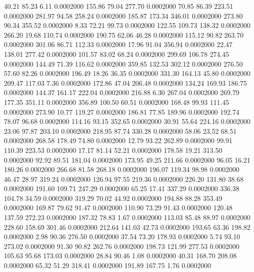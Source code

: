   40.21   85.23    6.11   0.0002000
 155.86   79.04  277.70   0.0002000
  70.85   86.39  223.51   0.0002000
 281.97   94.58  258.24   0.0002000
 185.87  173.34  346.01   0.0002000
 273.80   90.34  355.52   0.0002000
   8.33   72.21   99.73   0.0002000
 122.55  109.73  138.32   0.0002000
 266.20   19.68  110.74   0.0002000
 190.75   62.06   46.28   0.0002000
 115.12   90.82  263.70   0.0002000
 301.06   86.71  112.33   0.0002000
  17.96   91.04  356.94   0.0002000
  22.47  138.01  277.42   0.0002000
 101.57   83.02   68.24   0.0002000
 299.69  106.78  274.45   0.0002000
 144.49   71.39  116.62   0.0002000
 359.85  132.53  302.12   0.0002000
 276.50   57.60   82.26   0.0002000
 196.49   18.26   36.35   0.0002000
 331.30  164.13   45.80   0.0002000
 209.47  117.03    7.36   0.0002000
 172.86   47.04  206.48   0.0002000
 134.24  169.93  186.75   0.0002000
 144.37  161.17  222.04   0.0002000
 216.88    6.30  267.04   0.0002000
 269.79  177.35  351.11   0.0002000
 356.89  100.50   60.51   0.0002000
 168.48   99.93  111.45   0.0002000
 273.90   10.77  119.27   0.0002000
 186.81   77.85  189.96   0.0002000
 192.74   78.07   96.68   0.0002000
 114.16   93.15  352.65   0.0002000
  30.91   55.64  224.16   0.0002000
  23.06   97.87  203.10   0.0002000
 218.95   87.74  330.28   0.0002000
  58.06   23.52   68.51   0.0002000
 268.58  178.49   74.80   0.0002000
  12.79   93.22  262.89   0.0002000
  99.91  110.39  223.53   0.0002000
  17.17   81.14   52.21   0.0002000
 178.58   19.21  313.50   0.0002000
  92.92   89.51  181.04   0.0002000
 173.95   49.25  211.66   0.0002000
  96.05   16.21  180.26   0.0002000
 266.68   81.58  268.18   0.0002000
 196.07  119.34   98.98   0.0002000
  46.47   28.97  319.24   0.0002000
 126.94   97.55  219.36   0.0002000
 226.20  131.80   38.68   0.0002000
 191.60  109.71  247.29   0.0002000
  65.25   17.41  337.29   0.0002000
 336.38  104.78   34.59   0.0002000
 319.29   70.02   44.92   0.0002000
 194.88   88.28  353.49   0.0002000
 169.87   79.62   91.47   0.0002000
 110.90   73.29   91.43   0.0002000
 120.48  137.59  272.23   0.0002000
 187.32   78.83    1.67   0.0002000
 113.03   85.48   88.97   0.0002000
 228.60  158.69  301.46   0.0002000
 212.64  141.03   42.73   0.0002000
 193.65   63.36  198.82   0.0002000
   2.98   90.36  276.50   0.0002000
  37.54   73.20  178.93   0.0002000
   5.74   93.10  273.02   0.0002000
  91.30   90.82  262.76   0.0002000
 198.73  121.99  277.53   0.0002000
 105.63   95.68  173.03   0.0002000
  28.84   90.46    1.08   0.0002000
  40.31  168.70  208.08   0.0002000
  65.32   51.29  318.41   0.0002000
 191.89  167.75    1.76   0.0002000
